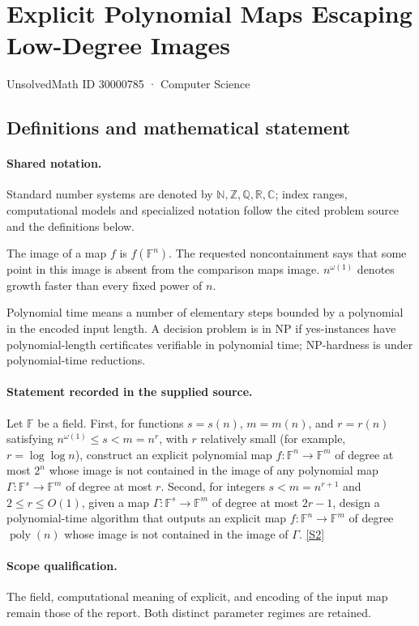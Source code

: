 \documentclass[11pt]{article}
\newcommand{\sref}[2]{\hyperlink{source:#1:#2}{[S#2]}}
\begin{document}
\setcounter{section}{30000784}
\section{Explicit Polynomial Maps Escaping Low-Degree Images}\label{30000785}
{\small\sffamily UnsolvedMath ID 30000785 · Computer Science}
\subsection{Definitions and mathematical statement}

\paragraph{Shared notation.}Standard number systems are denoted by $\mathbb N,\mathbb Z,\mathbb Q,\mathbb R,\mathbb C$; index ranges, computational models and specialized notation follow the cited problem source and the definitions below.


The image of a map $f$ is $f(\mathbb F^n)$. The requested noncontainment says that some point in this image is absent from the comparison map\textquotesingle s image. $n^{\omega(1)}$ denotes growth faster than every fixed power of $n$.

Polynomial time means a number of elementary steps bounded by a polynomial in the encoded input length. A decision problem is in $\mathrm{NP}$ if yes-instances have polynomial-length certificates verifiable in polynomial time; NP-hardness is under polynomial-time reductions.
\paragraph{Statement recorded in the supplied source.}
Let $\mathbb{F}$ be a field. First, for functions $s=s(n)$, $m=m(n)$, and $r=r(n)$ satisfying $n^{\omega(1)}\leq s<m=n^r$, with $r$ relatively small (for example, $r=\log\log n$), construct an explicit polynomial map $f:\mathbb{F}^n\to\mathbb{F}^m$ of degree at most $2^n$ whose image is not contained in the image of any polynomial map $\Gamma:\mathbb{F}^s\to\mathbb{F}^m$ of degree at most $r$. Second, for integers $s<m=n^{r+1}$ and $2\leq r\leq O(1)$, given a map $\Gamma:\mathbb{F}^s\to\mathbb{F}^m$ of degree at most $2r-1$, design a polynomial-time algorithm that outputs an explicit map $f:\mathbb{F}^n\to\mathbb{F}^m$ of degree $\operatorname{poly}(n)$ whose image is not contained in the image of $\Gamma$. \sref{30000785}{2}
\paragraph{Scope qualification.}
The field, computational meaning of explicit, and encoding of the input map remain those of the report. Both distinct parameter regimes are retained.
\end{document}

